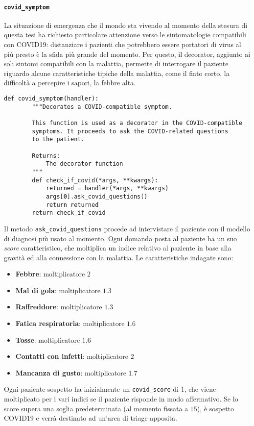 \paragraph{\texttt{covid\_symptom}} La situazione di emergenza che il mondo sta vivendo al momento della stesura di questa tesi ha richiesto particolare attenzione verso le sintomatologie compatibili con COVID19: distanziare i pazienti che potrebbero essere portatori di virus al più presto è la sfida più grande del momento. Per questo, il decorator, aggiunto ai soli sintomi compatibili con la malattia, permette di interrogare il paziente riguardo alcune caratteristiche tipiche della malattia, come il fiato corto, la difficoltà a percepire i sapori, la febbre alta.
\begin{verbatim}
def covid_symptom(handler):
        """Decorates a COVID-compatible symptom.

        This function is used as a decorator in the COVID-compatible
        symptoms. It proceeds to ask the COVID-related questions
        to the patient.

        Returns:
            The decorator function
        """
        def check_if_covid(*args, **kwargs):
            returned = handler(*args, **kwargs)
            args[0].ask_covid_questions()
            return returned
        return check_if_covid
\end{verbatim}
Il metodo \texttt{ask\_covid\_questions} procede ad intervistare il paziente con il modello di diagnosi più usato al momento. Ogni domanda posta al paziente ha un suo \textit{score} caratteristico, che moltiplica un indice relativo al paziente in base alla gravità ed alla connessione con la malattia. Le caratteristiche indagate sono:
\begin{itemize}
    \item \textbf{Febbre}: moltiplicatore $2$
    \item \textbf{Mal di gola}: moltiplicatore $1.3$
    \item \textbf{Raffreddore}: moltiplicatore $1.3$
    \item \textbf{Fatica respiratoria}: moltiplicatore $1.6$
    \item \textbf{Tosse}: moltiplicatore $1.6$
    \item \textbf{Contatti con infetti}: moltiplicatore $2$
    \item \textbf{Mancanza di gusto}: moltiplicatore $1.7$
\end{itemize}
Ogni paziente sospetto ha inizialmente un \texttt{covid\_score} di $1$, che viene moltiplicato per i vari indici se il paziente risponde in modo affermativo. Se lo score supera una soglia predeterminata (al momento fissata a $15$), è sospetto COVID19 e verrà destinato ad un'area di triage apposita.
